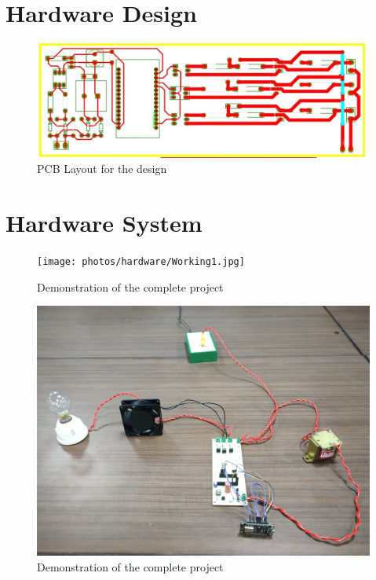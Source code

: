         \section{Hardware Design}
	        \begin{figure}[h!]
	        	\includegraphics[width=\textwidth]{photos/hardware/PCBDesign.jpg}
	        	\caption{PCB Layout for the design}
	        \end{figure}
		  
        \section{Hardware System}
	        \begin{figure}[h!]
	        	\texttt{[image: photos/hardware/Working1.jpg]}
	        	\caption{Demonstration of the complete project}
	        \end{figure}

			\begin{figure}[h!]
				\includegraphics[width=\textwidth]{photos/hardware/Working3.jpg}
				\caption{Demonstration of the complete project}
			\end{figure}  